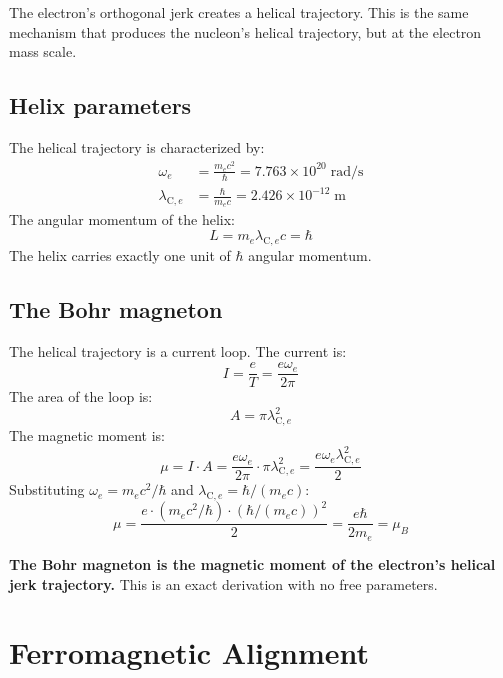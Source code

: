 \documentclass[11pt,letterpaper]{article}
\newcommand{\lambdace}{\lambda_{\mathrm{C},e}}
\begin{document}
The electron's orthogonal jerk creates a helical trajectory. This is the same
mechanism that produces the nucleon's helical trajectory, but at the electron
mass scale.

\subsection{Helix parameters}

The helical trajectory is characterized by:
\begin{align}
  \omega_e &= \frac{m_e c^2}{\hbar} = 7.763 \times 10^{20} \; \mathrm{rad/s} \\
  \lambdace &= \frac{\hbar}{m_e c} = 2.426 \times 10^{-12} \; \mathrm{m}
\end{align}
The angular momentum of the helix:
\begin{equation}
  L = m_e \lambdace c = \hbar
  \label{eq:helix_angular_momentum}
\end{equation}
The helix carries exactly one unit of $\hbar$ angular momentum.

\subsection{The Bohr magneton}

The helical trajectory is a current loop. The current is:
\begin{equation}
  I = \frac{e}{T} = \frac{e \omega_e}{2\pi}
  \label{eq:current}
\end{equation}
The area of the loop is:
\begin{equation}
  A = \pi \lambdace^2
  \label{eq:area}
\end{equation}
The magnetic moment is:
\begin{equation}
  \mu = I \cdot A
  = \frac{e \omega_e}{2\pi} \cdot \pi \lambdace^2
  = \frac{e \omega_e \lambdace^2}{2}
  \label{eq:mag_moment}
\end{equation}
Substituting $\omega_e = m_e c^2/\hbar$ and $\lambdace = \hbar/(m_e c)$:
\begin{equation}
  \mu = \frac{e \cdot (m_e c^2/\hbar) \cdot (\hbar/(m_e c))^2}{2}
  = \frac{e \hbar}{2 m_e}
  = \mu_B
  \label{eq:bohr_magneton}
\end{equation}

\textbf{The Bohr magneton is the magnetic moment of the electron's helical jerk
trajectory.} This is an exact derivation with no free parameters.

\section{Ferromagnetic Alignment}
\end{document}
